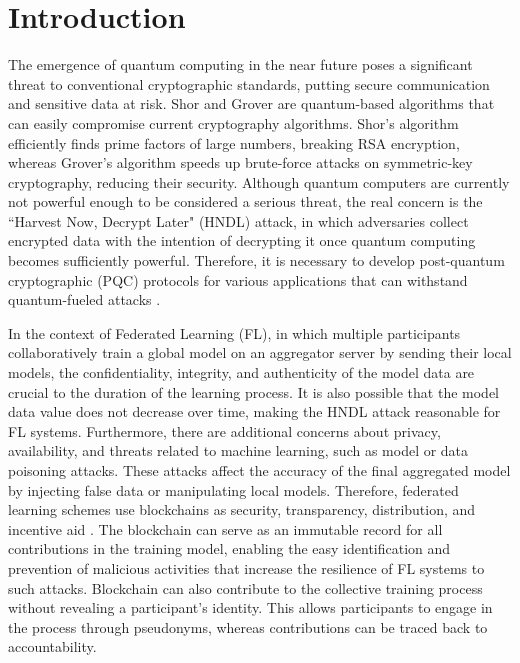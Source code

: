 \documentclass[a4paper,fleqn]{cas-dc}
\begin{document}
\maketitle

\setcounter{page}{1}



\section{Introduction}
\label{Introduction}

The emergence of quantum computing in the near future poses a significant threat to conventional cryptographic standards, putting secure communication and sensitive data at risk. 
Shor \citep{shor1994algorithms} and Grover \citep{grover1996fast} are quantum-based algorithms that can easily compromise current cryptography algorithms. 
Shor's algorithm efficiently finds prime factors of large numbers, breaking RSA encryption, whereas Grover's algorithm speeds up brute-force attacks on symmetric-key cryptography, reducing their security. 
Although quantum computers are currently not powerful enough to be considered a serious threat, the real concern is the ``Harvest Now, Decrypt Later" (HNDL) attack, in which adversaries collect encrypted data with the intention of decrypting it once quantum computing becomes sufficiently powerful.  
Therefore, it is necessary to develop post-quantum cryptographic (PQC) protocols for various applications that can withstand quantum-fueled attacks \citep{Post-Quantum_Blockchain_Security_for}.  

In the context of Federated Learning (FL), in which multiple participants collaboratively train a global model on an aggregator server by sending their local models, the confidentiality, integrity, and authenticity of the model data are crucial to the duration of the learning process. 
It is also possible that the model data value does not decrease over time, making the HNDL attack reasonable for FL systems.  
Furthermore, there are additional concerns about privacy, availability, and threats related to machine learning, such as model or data poisoning attacks.  
These attacks affect the accuracy of the final aggregated model by injecting false data or manipulating local models. 
Therefore, federated learning schemes use blockchains as security, transparency, distribution, and incentive aid \citep{Towards_blockchain-based,Securing_federated}.  
The blockchain can serve as an immutable record for all contributions in the training model, enabling the easy identification and prevention of malicious activities that increase the resilience of FL systems to such attacks. 
Blockchain can also contribute to the collective training process without revealing a participant's identity. 
This allows participants to engage in the process through pseudonyms, whereas contributions can be traced back to accountability.  
 
\end{document}
